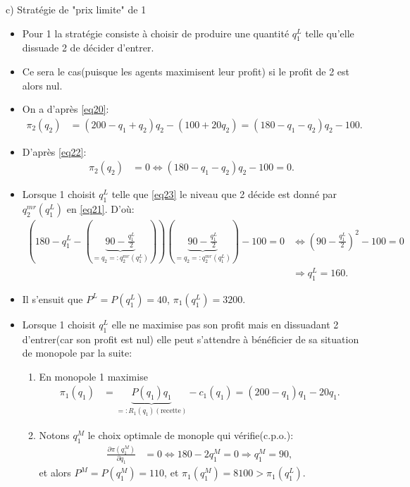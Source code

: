 \begin{frame}[allowframebreaks]{c) Stratégie de "prix limite" de 1}
    \begin{itemize}
        \item Pour 1 la stratégie consiste à choisir de produire une quantité $q_1^L$ telle qu'elle dissuade 2 
        de décider d'entrer. 
        \item Ce sera le cas(puisque les agents maximisent leur profit) si le profit de 2 est alors nul.
        \item On a d'après \eqref{eq20}:
        \begin{align}
            \pi_2(q_2) &= (200 - q_1 + q_2)q_2 - (100 + 20q_2) = (180 - q_1-q_2)q_2 - 100.
         \label{eq22}
        \end{align}
        \item D'après \eqref{eq22}:
        \begin{align}
            \pi_2(q_2) &= 0 \Leftrightarrow  (180 - q_1-q_2)q_2 - 100 = 0.
            \label{eq23}
        \end{align}
        \item Lorsque 1 choisit $q_1^L$ telle que \eqref{eq23} le niveau 
        que 2 décide est donné par $q_2^{mr}(q_1^L)$ en \eqref{eq21}. D'où:
        \begin{align*}
            \left(180-q_1^L - \left(\underbrace{90 - \frac{q_1^L}{2}}_{=q_2=:q_2^{mr}(q_1^L)}\right)\right)\left(
                \underbrace{90 - \frac{q_1^L}{2}}_{=q_2=:q_2^{mr}(q_1^L)}\right) - 100 = 0& \Leftrightarrow 
                \left(90-\frac{q_1^L}{2}\right)^2 -100=0\\
                &\Rightarrow q_1^L = 160.
        \end{align*}
        \item Il s'ensuit que $P^L = P(q_1^L) = 40$, $\pi_1(q_1^L) = 3200$.
        \item Lorsque 1 choisit $q_1^L$ elle ne maximise pas son profit 
        mais en dissuadant 2 d'entrer(car son profit est nul) elle peut 
        s'attendre à bénéficier de sa situation de monopole par la suite:
        \begin{enumerate}[-]
            \item En monopole 1 maximise
            \begin{align*}
                \pi_1(q_1) &= \underbrace{P(q_1)q_1}_{=:R_1(q_1)(\text{recette})} -c_1(q_1) = (200-q_1)q_1 - 20q_1.
            \end{align*}
            \item Notons $q_1^M$ le choix optimale de monople qui vérifie(c.p.o.): 
            \begin{align*}
                \frac{\partial \pi(q_1^M)}{\partial q_1} &= 0 \Leftrightarrow 180-2q_1^M = 0\Rightarrow q_1^M = 90,
            \end{align*}
            et alors $P^M=P(q_1^M) = 110$, et $\pi_1(q_1^M) = 8100 > \pi_1(q_1^L)$.
        \end{enumerate}
    \end{itemize}
    \end{frame}
